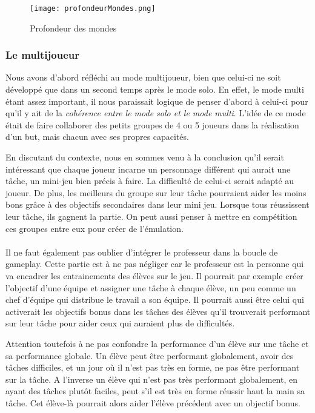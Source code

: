 \begin{figure}[H]
    \begin{center}
    \texttt{[image: profondeurMondes.png]}
    \end{center}
    \caption{Profondeur des mondes}
\label{ProfondeurMondes}
\end{figure}

\subsubsection{Le multijoueur}Nous avons d'abord réfléchi au mode multijoueur, bien que celui-ci ne soit développé que dans un second temps après le mode solo. En effet, le mode multi
étant assez important, il nous paraissait logique de penser d'abord à celui-ci pour qu'il y ait de la \emph{cohérence entre le mode solo et le mode multi}. L'idée de ce mode était de
faire collaborer des petits groupes de 4 ou 5 joueurs dans la réalisation d'un but, mais chacun avec ses propres capacités.

En discutant du contexte, nous en sommes venu à la
conclusion qu'il serait intéressant que chaque joueur incarne un personnage différent qui aurait une tâche, un mini-jeu bien précis à faire. La difficulté de celui-ci serait adapté
au joueur. De plus, les meilleurs du groupe sur leur tâche pourraient aider les moins bons grâce à des objectifs secondaires dans leur mini jeu. Lorsque tous réussissent leur tâche,
ils gagnent la partie. On peut aussi penser à mettre en compétition ces groupes entre eux pour créer de l'émulation.

\paragraph{}Il ne faut également pas oublier d'intégrer le professeur dans la boucle de gameplay. Cette partie est à ne pas négliger car le professeur est la personne qui va encadrer les
entrainements des élèves sur le jeu. Il pourrait par exemple créer l'objectif d'une équipe et assigner une tâche à chaque élève, un peu comme un chef d'équipe qui distribue le travail
a son équipe. Il pourrait aussi être celui qui activerait les objectifs bonus dans les tâches des élèves qu'il trouverait performant sur leur tâche pour aider ceux qui auraient plus de
difficultés.

Attention toutefois à ne pas confondre la performance d'un élève sur une tâche et sa performance globale. Un élève peut être performant globalement, avoir des tâches
difficiles, et un jour où il n'est pas très en forme, ne pas être performant sur la tâche. A l'inverse un élève qui n'est pas très performant globalement, en ayant des tâches plutôt
faciles, peut s'il est très en forme réussir haut la main sa tâche. Cet élève-là pourrait alors aider l'élève précédent avec un objectif bonus.

